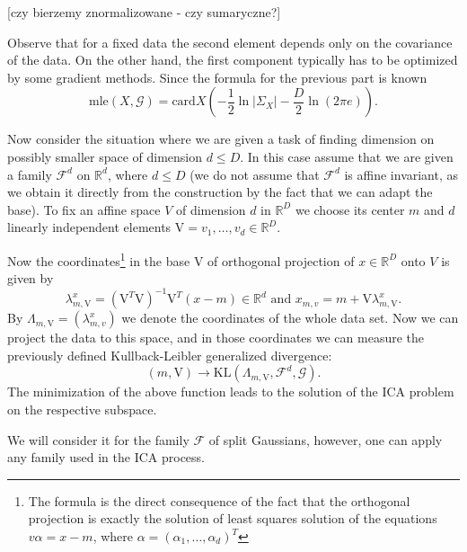 \documentclass[12pt]{article}
\def\R{\mathbb{R}}
\def\v{\mathrm{V}}
\def\F{\mathcal{F}}
\def\G{\mathcal{G}}
\def\KL{\mathrm{KL}}
\def\mle{\mathrm{mle}}
\def\card{\mathrm{card}}
\theoremstyle{definition}
\begin{document}
[czy bierzemy znormalizowane - czy sumaryczne?]

Observe that for a fixed data the second element depends only on the covariance of the data. On the other hand, the first component typically has to be optimized by some gradient methods. Since the formula for the previous part is known
$$
\mle(X,\G)=\card X(-\frac{1}{2}\ln |\Sigma_X|-\frac{D}{2}\ln(2\pi e)).
$$

Now consider the situation where we are given a task of finding dimension on possibly smaller space of dimension $d \leq D$.
In this case assume that we are given a family $\F^d$ on $\R^d$, where $d \leq D$ (we do not assume that $\F^d$ is affine invariant, as we obtain it directly from the construction by the fact that we can adapt the base).
To fix an affine space $V$ of dimension $d$ in $\R^D$ we choose its center $m$
and $d$ linearly independent elements $\v=v_1,\ldots,v_d \in \R^D$.

Now the coordinates\footnote{The formula is the direct consequence of the fact that the orthogonal projection is exactly the solution of least squares solution of the equations 
$v \alpha=x-m$, where $\alpha=(\alpha_1,\ldots,\alpha_d)^T$} in the base $\v$ of orthogonal projection of $x \in \R^D$ onto $V$ is given by
\begin{equation} \label{eq:coord}
\lambda_{m,\v}^x=(\v^T\v)^{-1}\v^T(x-m) \in \R^d \text{ and }
x_{m,v}=m+\v\lambda_{m,\v}^x.
\end{equation}
By $\Lambda_{m,\v}=(\lambda^x_{m,v})$ we denote the coordinates of the whole data set.
Now we can project the data to this space, and in those coordinates we can measure
the previously defined Kullback-Leibler generalized divergence:
\begin{equation} \label{eq:KL}
(m,\v) \to \KL(\Lambda_{m,\v},\F^d,\G).
\end{equation}
The minimization of the above function leads to the solution of the ICA
problem on the respective subspace.

We will consider it for the family $\F$ of split Gaussians, however, one can apply any family used in the ICA process.
 
\end{document}
